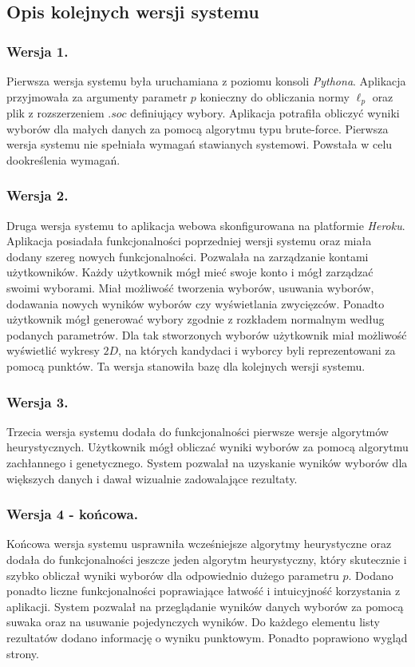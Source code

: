 \documentclass[polish,11pt]{aghthesis}
\begin{document}
\subsection{Opis kolejnych wersji systemu}
\subsubsection{Wersja 1.}
Pierwsza wersja systemu była uruchamiana z poziomu konsoli \textit{Pythona}. Aplikacja
przyjmowała za argumenty parametr $p$ konieczny do obliczania normy $\ell_p$ oraz plik z
rozszerzeniem $.soc$ definiujący wybory. Aplikacja potrafiła obliczyć wyniki wyborów dla
małych danych za pomocą algorytmu typu brute-force. Pierwsza wersja systemu nie spełniała wymagań stawianych systemowi. Powstała w celu dookreślenia wymagań.

\subsubsection{Wersja 2.}
Druga wersja systemu to aplikacja webowa skonfigurowana na platformie \textit{Heroku}. Aplikacja
posiadała funkcjonalności poprzedniej wersji systemu oraz miała dodany szereg nowych
funkcjonalności. Pozwalała na zarządzanie kontami użytkowników. Każdy użytkownik mógł
mieć swoje konto i mógł zarządzać swoimi wyborami. Miał możliwość tworzenia wyborów,
usuwania wyborów, dodawania nowych wyników wyborów czy wyświetlania zwycięzców.
Ponadto użytkownik mógł generować wybory zgodnie z rozkładem normalnym według
podanych parametrów. Dla tak stworzonych wyborów użytkownik miał możliwość wyświetlić
wykresy $2D$, na których kandydaci i wyborcy byli reprezentowani za pomocą punktów. Ta
wersja stanowiła bazę dla kolejnych wersji systemu.

\subsubsection{Wersja 3.}
Trzecia wersja systemu dodała do funkcjonalności pierwsze wersje algorytmów
heurystycznych. Użytkownik mógł obliczać wyniki wyborów za pomocą algorytmu
zachłannego i genetycznego. System pozwalał na uzyskanie wyników wyborów dla
większych danych i dawał wizualnie zadowalające rezultaty.

\subsubsection{Wersja 4 - końcowa.}
Końcowa wersja systemu usprawniła wcześniejsze algorytmy heurystyczne oraz dodała do
funkcjonalności jeszcze jeden algorytm heurystyczny, który skutecznie i szybko obliczał
wyniki wyborów dla odpowiednio dużego parametru $p$. Dodano ponadto liczne
funkcjonalności poprawiające łatwość i intuicyjność korzystania z aplikacji. System pozwalał
na przeglądanie wyników danych wyborów za pomocą suwaka oraz na usuwanie
pojedynczych wyników. Do każdego elementu listy rezultatów dodano informację o wyniku
punktowym. Ponadto poprawiono wygląd strony.
\end{document}
